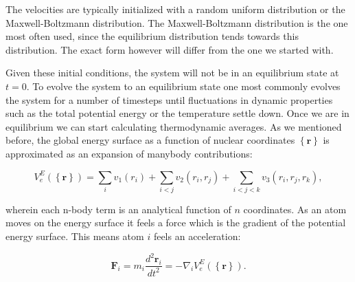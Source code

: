 \par
The velocities are typically initialized with a random uniform
distribution or the Maxwell-Boltzmann distribution.
The Maxwell-Boltzmann distribution is the one most often used,
since the equilibrium distribution tends towards this distribution.
The exact form however will differ from the one we started with.
\par
Given these initial conditions, the system will not be in an
equilibrium state at $t=0$. To evolve the system
to an equilibrium state one most commonly evolves the system
for a number of timesteps until fluctuations in dynamic
properties such as the total potential energy or the temperature
settle down. Once we are in equilibrium we can start calculating
thermodynamic averages.
\newline
\newline
As we mentioned before, the global energy surface
as a function of nuclear coordinates $\left\{ \bm{r} \right\}$
is approximated as an expansion of manybody contributions:

\begin{equation}
 V_e^E \left(\left\{ \bm{r} \right\}\right) =
    \sum_i v_1(r_i) + \sum_{i < j} v_2(r_i, r_j)
    + \sum_{i < j < k} v_3(r_i, r_j, r_k) , 
\end{equation}

wherein each n-body term is an analytical function
of $n$ coordinates.
As an atom moves on the energy surface
it feels a force which is the gradient of the potential energy surface.
This means atom $i$ feels an acceleration:

\begin{equation}
 \bm{F}_i = m_i \frac{d^2 \bm{r}_i}{dt^2} =
    -\nabla_i V_e^E \left( \left\{ \bm{r} \right\}\right) . 
\end{equation}

